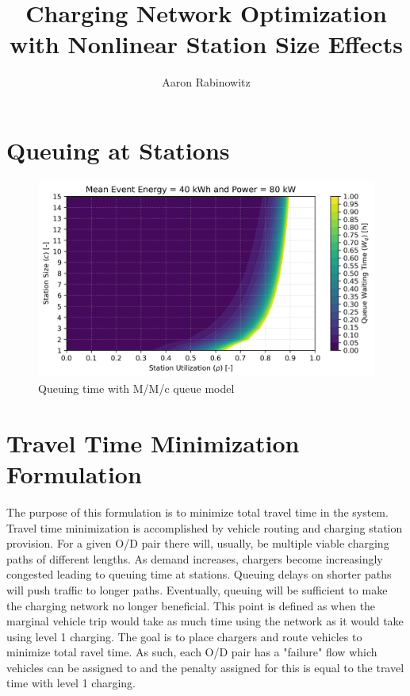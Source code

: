 \documentclass[12pt]{article}
\title{Charging Network Optimization with Nonlinear Station Size Effects}
\author{Aaron Rabinowitz}
\date{}
\begin{document}
\maketitle

\section{Queuing at Stations}

\begin{figure}[H]
	\centering
	\includegraphics[width = .7\linewidth]{figs/queue.png}
	\caption{Queuing time with M/M/c queue model}
	\label{fig:queue}
\end{figure}


\section{Travel Time Minimization Formulation}

The purpose of this formulation is to minimize total travel time in the system. Travel time minimization is accomplished by vehicle routing and charging station provision. For a given O/D pair there will, usually, be multiple viable charging paths of different lengths. As demand increases, chargers become increasingly congested leading to queuing time at stations. Queuing delays on shorter paths will push traffic to longer paths. Eventually, queuing will be sufficient to make the charging network no longer beneficial. This point is defined as when the marginal vehicle trip would take as much time using the network as it would take using level 1 charging. The goal is to place chargers and route vehicles to minimize total ravel time. As such, each O/D pair has a "failure" flow which vehicles can be assigned to and the penalty assigned for this is equal to the travel time with level 1 charging.
\end{document}
